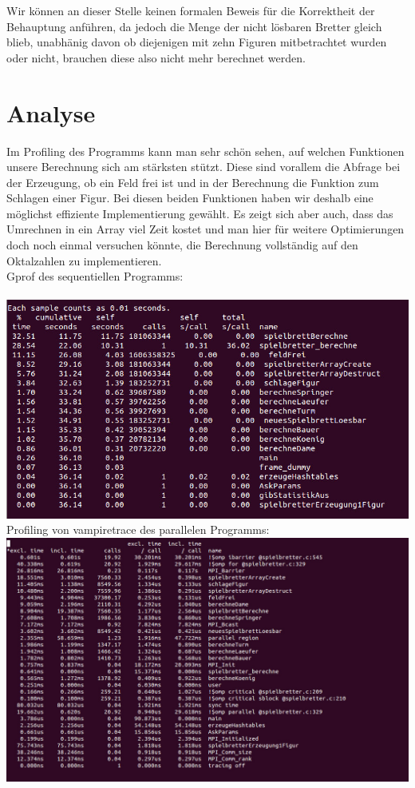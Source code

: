 \documentclass[
	12pt,
	a4paper,
	BCOR10mm,
	DIV14,
	listof=totoc,
	bibliography=totoc,
	headsepline
]{scrreprt}
\begin{document}
Wir können an dieser Stelle keinen formalen Beweis für die Korrektheit der Behauptung anführen, da jedoch die Menge der nicht lösbaren Bretter gleich blieb, unabhänig davon ob diejenigen mit zehn Figuren mitbetrachtet wurden oder nicht, brauchen diese also nicht mehr berechnet werden. 


\section{Analyse}
Im Profiling des Programms kann man sehr schön sehen, auf welchen Funktionen unsere Berechnung sich am stärksten stützt. Diese sind vorallem die Abfrage bei der Erzeugung, ob ein Feld frei ist und in der Berechnung die Funktion zum Schlagen einer Figur. 
Bei diesen beiden Funktionen haben wir deshalb eine möglichst effiziente Implementierung gewählt. Es zeigt sich aber auch, dass das Umrechnen in ein Array viel Zeit kostet und man hier für weitere Optimierungen doch noch einmal versuchen könnte, die Berechnung vollständig auf den Oktalzahlen zu implementieren.
\\
Gprof des sequentiellen Programms:\\
\\
\includegraphics[scale=0.6]{gprof}
\newline
\newline
\newline
Profiling von vampiretrace des parallelen Programms:\\
\includegraphics[scale=0.4]{vampirtrace-prof}
\end{document}
